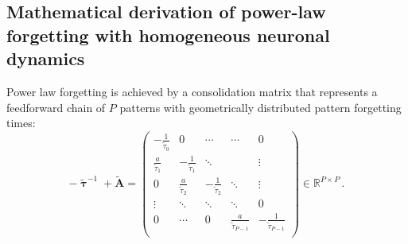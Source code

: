 \subsection{Mathematical derivation of power-law forgetting with homogeneous neuronal dynamics}
\label{sub:power_law_forgetting}

Power law forgetting is achieved by a consolidation matrix that represents a feedforward chain of $P$ patterns with geometrically distributed pattern forgetting times: %
%
%
%
\begin{equation}
- \mathbf{\tilde{\uptau}}^{-1} + \mathbf{\tilde{A}} =  \begin{pmatrix}
- \frac{1}{\tilde{\tau}_0} & 0 & \cdots & \cdots & 0 \\%
 \frac{a}{\tilde{\tau}_1} & - \frac{1}{\tilde{\tau}_1} & \ddots & & \vdots \\
0 & \frac{a}{\tilde{\tau}_2} & - \frac{1}{\tilde{\tau}_2} & \ddots & \vdots \\
\vdots & \ddots & \ddots & \ddots & 0 \\
0 & \cdots & 0 & \frac{a}{\tilde{\tau}_{P-1}} & -\frac{1}{\tilde{\tau}_{P-1}}\\
\end{pmatrix} \in \mathbb{R}^{P \times P} \,.
\end{equation}

